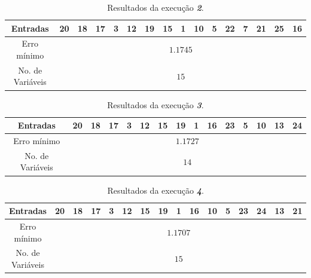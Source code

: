 \begin{enumerate}
\begin{enumerate}
			\begin{table}[H]
				    \centering
					\caption{\label{tab:forward2_sunspot} Resultados da execução
					\textit{\textbf{2}}.}
					\footnotesize
				    \vspace{-6pt}
					\begin{tabular}{|c | c | c | c | c | c | c | c | c | c | c | c | c | c | c |
					c|}
					\hline
					Entradas & 20 & 18 & 17 & 3 & 12 & 19 & 15 & 1 & 10 & 5 & 22 & 7 & 21 & 25 & 16 \\
					\hline
					Erro mínimo & \multicolumn{15}{c|}{\(1.1745\)}  \\ \hline
					No. de Variáveis & \multicolumn{15}{c|}{\(15\)}  \\
					\hline
					
					\end{tabular}	    
			    \end{table}     

		\vspace{-12pt}

			\begin{table}[H]
				    \centering
				    \footnotesize
					\caption{\label{tab:forward3_sunspot} Resultados da execução
					\textit{\textbf{3}}.}
				    \vspace{-6pt}
					\begin{tabular}{|c | c | c | c | c | c | c | c | c | c | c | c | c | c | c|}
					\hline
					Entradas & 20 & 18 & 17 & 3 & 12 & 15 & 19 & 1 & 16 & 23 & 5 & 10 & 13 & 24 \\
					\hline
					Erro mínimo & \multicolumn{14}{c|}{\(1.1727\)}  \\ \hline
					No. de Variáveis & \multicolumn{14}{c|}{\(14\)}  \\
					\hline
					
					\end{tabular}	    
			    \end{table}     

		\vspace{-12pt}

			\begin{table}[H]
				    \centering
				    \footnotesize
					\caption{\label{tab:forward4_sunspot} Resultados da execução
					\textit{\textbf{4}}.}
				    \vspace{-6pt}
					\begin{tabular}{|c | c | c | c | c | c | c | c | c | c | c | c | c | c | c
					| c|}
					\hline
					Entradas & 20 & 18 & 17 & 3 & 12 & 15 & 19 & 1 & 16 & 10 & 5 & 23 & 24 & 13 & 21 \\
					\hline
					Erro mínimo & \multicolumn{15}{c|}{\(1.1707\)}  \\ \hline
					No. de Variáveis & \multicolumn{15}{c|}{\(15\)}  \\
					\hline
					

\end{tabular}
\end{table}
\end{enumerate}
\end{enumerate}
